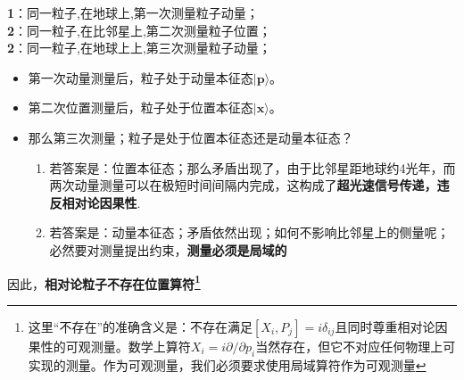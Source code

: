 \begin{tcolorbox}[colback=white, colframe=black!40]
\textbf{1}：同一粒子,在地球上,第一次测量粒子动量；\\
\textbf{2}：同一粒子,在比邻星上,第二次测量粒子位置；\\
\textbf{2}：同一粒子,在地球上上,第三次测量粒子动量；
\begin{itemize}
    \item 第一次动量测量后，粒子处于动量本征态$|\boldsymbol{p}\rangle$。
    \item 第二次位置测量后，粒子处于位置本征态$|\boldsymbol{x}\rangle$。
    \item 那么第三次测量；粒子是处于位置本征态还是动量本征态？
    \begin{enumerate}
        \item 若答案是：位置本征态；那么矛盾出现了，由于比邻星距地球约4光年，而两次动量测量可以在极短时间间隔内完成，这构成了\textbf{超光速信号传递，违反相对论因果性}.
        \item 若答案是：动量本征态；矛盾依然出现；如何不影响比邻星上的侧量呢；必然要对测量提出约束，\textbf{测量必须是局域的}
    \end{enumerate}
    \end{itemize}
        因此，\textbf{相对论粒子不存在位置算符\footnote{这里``不存在''的准确含义是：不存在满足$[X_i, P_j] = i\delta_{ij}$且同时尊重相对论因果性的可观测量。数学上算符$X_i = i\partial/\partial p_i$当然存在，但它不对应任何物理上可实现的测量。作为可观测量，我们必须要求使用局域算符作为可观测量}}
\end{tcolorbox}
\noindent 
